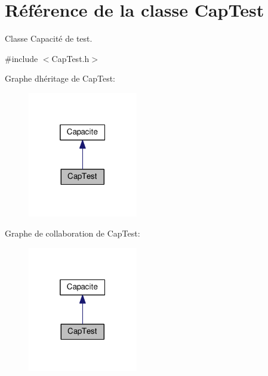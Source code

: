 \hypertarget{class_cap_test}{}\section{Référence de la classe Cap\+Test}
\label{class_cap_test}


Classe Capacité de test.  




{\ttfamily \#include $<$Cap\+Test.\+h$>$}



Graphe d\textquotesingle{}héritage de Cap\+Test\+:\nopagebreak
\begin{figure}[H]
\begin{center}
\leavevmode
\includegraphics[width=136pt]{class_cap_test__inherit__graph}
\end{center}
\end{figure}


Graphe de collaboration de Cap\+Test\+:\nopagebreak
\begin{figure}[H]
\begin{center}
\leavevmode
\includegraphics[width=136pt]{class_cap_test__coll__graph}
\end{center}
\end{figure}
